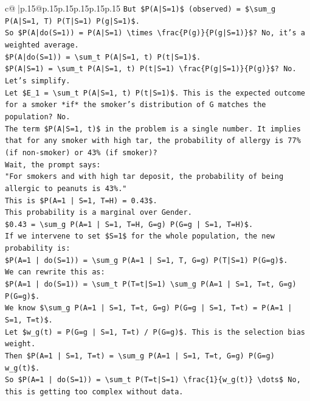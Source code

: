 \documentclass{article}
\begin{document}
{\begin{supertabular}{c@{$\;$}|p{.15\linewidth}@{}p{.15\linewidth}p{.15\linewidth}p{.15\linewidth}p{.15\linewidth}p{.15\linewidth}}
{{{\texttt{But \$P(A|S=1)\$ (observed) = \$\textbackslash{}sum\_g P(A|S=1, T) P(T|S=1) P(g|S=1)\$.} \\
\texttt{So \$P(A|do(S=1)) = P(A|S=1) \textbackslash{}times \textbackslash{}frac\{P(g)\}\{P(g|S=1)\}\$? No, it's a weighted average.} \\
\texttt{\$P(A|do(S=1)) = \textbackslash{}sum\_t P(A|S=1, t) P(t|S=1)\$.} \\
\texttt{\$P(A|S=1) = \textbackslash{}sum\_t P(A|S=1, t) P(t|S=1) \textbackslash{}frac\{P(g|S=1)\}\{P(g)\}\$? No.} \\
\texttt{Let's simplify.} \\
\texttt{Let \$E\_1 = \textbackslash{}sum\_t P(A|S=1, t) P(t|S=1)\$. This is the expected outcome for a smoker *if* the smoker's distribution of G matches the population? No.} \\
\texttt{The term \$P(A|S=1, t)\$ in the problem is a single number. It implies that for any smoker with high tar, the probability of allergy is 77\% (if non{-}smoker) or 43\% (if smoker)?} \\
\texttt{Wait, the prompt says:} \\
\texttt{"For smokers and with high tar deposit, the probability of being allergic to peanuts is 43\%."} \\
\texttt{This is \$P(A=1 | S=1, T=H) = 0.43\$.} \\
\texttt{This probability is a marginal over Gender.} \\
\texttt{\$0.43 = \textbackslash{}sum\_g P(A=1 | S=1, T=H, G=g) P(G=g | S=1, T=H)\$.} \\
\texttt{If we intervene to set \$S=1\$ for the whole population, the new probability is:} \\
\texttt{\$P(A=1 | do(S=1)) = \textbackslash{}sum\_g P(A=1 | S=1, T, G=g) P(T|S=1) P(G=g)\$.} \\
\texttt{We can rewrite this as:} \\
\texttt{\$P(A=1 | do(S=1)) = \textbackslash{}sum\_t P(T=t|S=1) \textbackslash{}sum\_g P(A=1 | S=1, T=t, G=g) P(G=g)\$.} \\
\texttt{We know \$\textbackslash{}sum\_g P(A=1 | S=1, T=t, G=g) P(G=g | S=1, T=t) = P(A=1 | S=1, T=t)\$.} \\
\texttt{Let \$w\_g(t) = P(G=g | S=1, T=t) / P(G=g)\$. This is the selection bias weight.} \\
\texttt{Then \$P(A=1 | S=1, T=t) = \textbackslash{}sum\_g P(A=1 | S=1, T=t, G=g) P(G=g) w\_g(t)\$.} \\
\texttt{So \$P(A=1 | do(S=1)) = \textbackslash{}sum\_t P(T=t|S=1) \textbackslash{}frac\{1\}\{w\_g(t)\} \textbackslash{}dots\$ No, this is getting too complex without data.} \\
}}}
\end{supertabular}}
\end{document}
